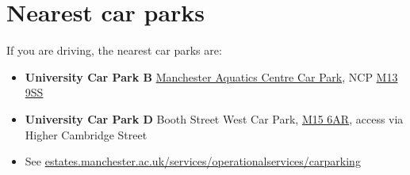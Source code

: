 \documentclass[12pt,]{book}
\providecommand{\tightlist}{%
  \setlength{\itemsep}{0pt}\setlength{\parskip}{0pt}}
\begin{document}
\hypertarget{nearest-car-parks}{%
\section{Nearest car parks}\label{nearest-car-parks}}

If you are driving, the nearest car parks are:

\begin{itemize}
\tightlist
\item
  \textbf{University Car Park B} \href{https://www.ncp.co.uk/find-a-car-park/car-parks/manchester-aquatic-centre-jv/}{Manchester Aquatics Centre Car Park}, NCP \href{http://maps.google.co.uk/maps?q=M13+9SS}{M13 9SS}
\item
  \textbf{University Car Park D} Booth Street West Car Park, \href{http://maps.google.co.uk/maps?q=M15+6AR}{M15 6AR}, access via Higher Cambridge Street
\item
  See \href{https://www.estates.manchester.ac.uk/services/operationalservices/carparking/}{estates.manchester.ac.uk/services/operationalservices/carparking}
\end{itemize}


\end{document}
